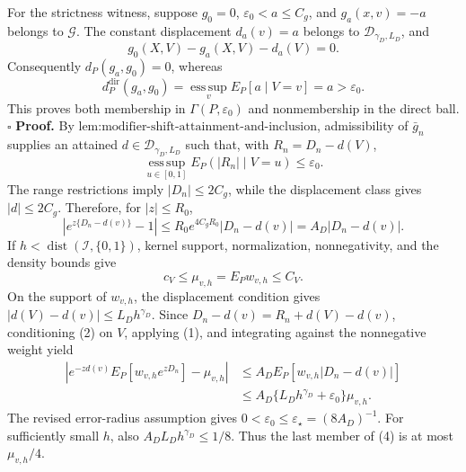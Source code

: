For the strictness witness, suppose \(g_0=0\), \(\varepsilon_0<a\le C_g\), and \(g_a(x,v)=-a\) belongs to \(\mathcal G\).  The constant displacement \(d_a(v)=a\) belongs to \(\mathcal D_{\gamma_D,L_D}\), and
\[
 g_0(X,V)-g_a(X,V)-d_a(V)=0.
\]
Consequently \(d_P(g_a,g_0)=0\), whereas
\[
 d_P^{\mathrm{dir}}(g_a,g_0)
 =\operatorname*{ess\,sup}_{v}E_P[a\mid V=v]=a>\varepsilon_0. \tag{8}
\]
This proves both membership in \(\Gamma(P,\varepsilon_0)\) and nonmembership in the direct ball. \(\square\)
\textbf{Proof.}
By \(\text{lem:modifier-shift-attainment-and-inclusion}\), admissibility of \(\bar g_n\) supplies an attained \(d\in\mathcal D_{\gamma_D,L_D}\) such that, with \(R_n=D_n-d(V)\),
\[
 \operatorname*{ess\,sup}_{u\in[0,1]}E_P(|R_n|\mid V=u)\le\varepsilon_0. \tag{1}
\]
The range restrictions imply \(|D_n|\le2C_g\), while the displacement class gives \(|d|\le2C_g\).  Therefore, for \(|z|\le R_0\),
\[
 \left|e^{z\{D_n-d(v)\}}-1\right|
 \le R_0e^{4C_gR_0}|D_n-d(v)|=A_D|D_n-d(v)|. \tag{2}
\]
If \(h<\operatorname{dist}(\mathcal I,\{0,1\})\), kernel support, normalization, nonnegativity, and the density bounds give
\[
 c_V\le\mu_{v,h}=E_Pw_{v,h}\le C_V. \tag{3}
\]
On the support of \(w_{v,h}\), the displacement condition gives \(|d(V)-d(v)|\le L_Dh^{\gamma_D}\).  Since
\(D_n-d(v)=R_n+d(V)-d(v)\), conditioning (2) on \(V\), applying (1), and integrating against the nonnegative weight yield
\[
 \begin{aligned}
 \left|e^{-zd(v)}E_P[w_{v,h}e^{zD_n}]-\mu_{v,h}\right|
 &\le A_DE_P[w_{v,h}|D_n-d(v)|]\\
 &\le A_D\{L_Dh^{\gamma_D}+\varepsilon_0\}\mu_{v,h}.
 \end{aligned} \tag{4}
\]
The revised error-radius assumption gives \(0<\varepsilon_0\le\varepsilon_\star=(8A_D)^{-1}\).  For sufficiently small \(h\), also \(A_DL_Dh^{\gamma_D}\le1/8\).  Thus the last member of (4) is at most \(\mu_{v,h}/4\).

